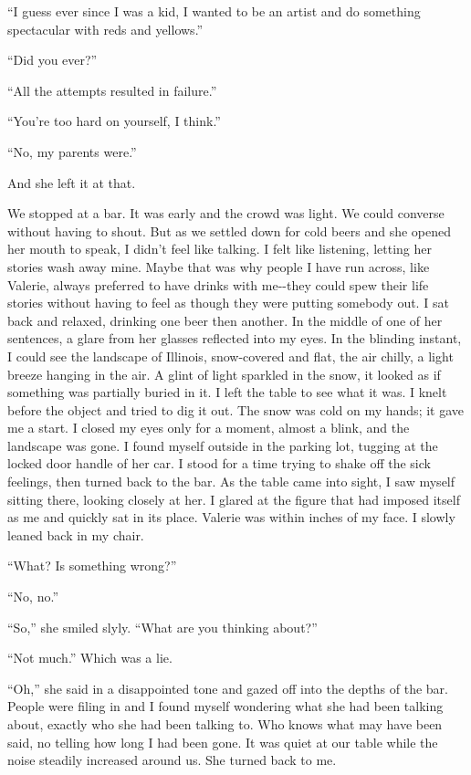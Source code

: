 ``I guess ever since I was a kid, I wanted to be an artist and do
something spectacular with reds and yellows.''

``Did you ever?''

``All the attempts resulted in failure.''

``You're too hard on yourself, I think.''

``No, my parents were.''

And she left it at that.

We stopped at a bar. It was early and the crowd was light. We could
converse without having to shout. But as we settled down for cold beers
and she opened her mouth to speak, I didn't feel like talking. I felt
like listening, letting her stories wash away mine. Maybe that was why
people I have run across, like Valerie, always preferred to have drinks
with me-\/-they could spew their life stories without having to feel as
though they were putting somebody out. I sat back and relaxed, drinking
one beer then another. In the middle of one of her sentences, a glare
from her glasses reflected into my eyes. In the blinding instant, I
could see the landscape of Illinois, snow-covered and flat, the air
chilly, a light breeze hanging in the air. A glint of light sparkled in
the snow, it looked as if something was partially buried in it. I left
the table to see what it was. I knelt before the object and tried to dig
it out. The snow was cold on my hands; it gave me a start. I closed my
eyes only for a moment, almost a blink, and the landscape was gone. I
found myself outside in the parking lot, tugging at the locked door
handle of her car. I stood for a time trying to shake off the sick
feelings, then turned back to the bar. As the table came into sight, I
saw myself sitting there, looking closely at her. I glared at the figure
that had imposed itself as me and quickly sat in its place. Valerie was
within inches of my face. I slowly leaned back in my chair.

``What? Is something wrong?''

``No, no.''

``So,'' she smiled slyly. ``What are you thinking about?''

``Not much.'' Which was a lie.

``Oh,'' she said in a disappointed tone and gazed off into the depths of
the bar. People were filing in and I found myself wondering what she had
been talking about, exactly who she had been talking to. Who knows what
may have been said, no telling how long I had been gone. It was quiet at
our table while the noise steadily increased around us. She turned back
to me.

